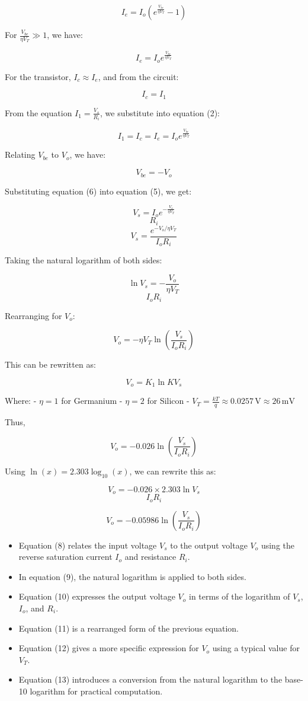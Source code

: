 \documentclass[a4paper,9pt,twoside,openany,twocolumn]{memoir}
\begin{document}
\[
I_e = I_o \left( e^{\frac{V_{be}}{\eta V_T}} - 1 \right) \tag{1}
\]

For \( \frac{V_{be}}{\eta V_T} \gg 1 \), we have:

\[
I_e = I_o e^{\frac{V_{be}}{\eta V_T}} \tag{2}
\]

For the transistor, \( I_c \approx I_e \), and from the circuit:

\[
I_c = I_1 \tag{3}
\]

From the equation \( I_1 = \frac{V_s}{R_i} \), we substitute into equation (2):

\[
I_1 = I_c = I_e = I_o e^{\frac{V_{be}}{\eta V_T}} \tag{5}
\]

Relating \( V_{be} \) to \( V_o \), we have:

\[
V_{be} = -V_o \tag{6}
\]

Substituting equation (6) into equation (5), we get:

\[
V_s = I_o e^{-\frac{V_o}{\eta V_T}} \tag{7}
\]
\[
R_i
\]
\[
V_s = \frac{e^{-V_o / \eta V_T}}{I_o R_i} \tag{8}
\]

Taking the natural logarithm of both sides:

\[
\ln V_s = -\frac{V_o}{\eta V_T} \tag{9}
\]
\[
I_o R_i
\]

Rearranging for \( V_o \):

\[
V_o = -\eta V_T \ln \left( \frac{V_s}{I_o R_i} \right) \tag{10}
\]

This can be rewritten as:

\[
V_o = K_1 \ln K V_s \tag{11}
\]

Where:
- \( \eta = 1 \) for Germanium
- \( \eta = 2 \) for Silicon
- \( V_T = \frac{kT}{q} \approx 0.0257 \, \text{V} \approx 26 \, \text{mV} \)

Thus,

\[
V_o = -0.026 \ln \left( \frac{V_s}{I_o R_i} \right) \tag{12}
\]

Using \( \ln(x) = 2.303 \log_{10}(x) \), we can rewrite this as:

\[
V_o = -0.026 \times 2.303 \ln V_s \tag{13}
\]
\[
I_o R_i
\]

\[
V_o = -0.05986 \ln \left( \frac{V_s}{I_o R_i} \right) \tag{13}
\]



\begin{itemize}
    \item Equation (8) relates the input voltage \( V_s \) to the output voltage \( V_o \) using the reverse saturation current \( I_o \) and resistance \( R_i \).
    \item In equation (9), the natural logarithm is applied to both sides.
    \item Equation (10) expresses the output voltage \( V_o \) in terms of the logarithm of \( V_s \), \( I_o \), and \( R_i \).
    \item Equation (11) is a rearranged form of the previous equation.
    \item Equation (12) gives a more specific expression for \( V_o \) using a typical value for \( V_T \).
    \item Equation (13) introduces a conversion from the natural logarithm to the base-10 logarithm for practical computation.
\end{itemize}
\end{document}
